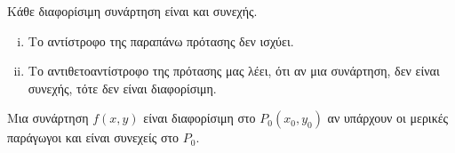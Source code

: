     \begin{prop}
        Κάθε διαφορίσιμη συνάρτηση είναι και συνεχής.
    \end{prop}

    \begin{rem}
    \item {}
        \begin{enumerate}[i)]
            \item Το αντίστροφο της παραπάνω πρότασης δεν ισχύει.
            \item Το αντιθετοαντίστροφο της πρότασης μας λέει, ότι αν μια συνάρτηση, 
                δεν είναι συνεχής, τότε δεν είναι διαφορίσιμη.
        \end{enumerate}
    \end{rem}
        \begin{thm}
        \item {}
            Μια συνάρτηση $ f(x,y) $ είναι διαφορίσιμη στο $ P_{0}(x_{0}, y_{0}) $ 
            αν υπάρχουν οι μερικές παράγωγοι και είναι συνεχείς στο $ P_{0} $.
        \end{thm}

\newpage


